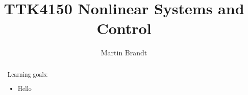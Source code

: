 \documentclass[num-refs]{wiley-networks}
\title{TTK4150 Nonlinear Systems and Control}
\author[1\authfn{1}]{Martin Brandt}
\begin{document}
\renewcommand{\labelitemi}{$*$}

\maketitle

\begin{abstract}
Learning goals:
\begin{itemize}
\item Hello
\end{itemize}
\end{abstract}
\setlength{\parindent}{0pt}
\newpage

\tableofcontents

\newpage






%
%
\end{document}
